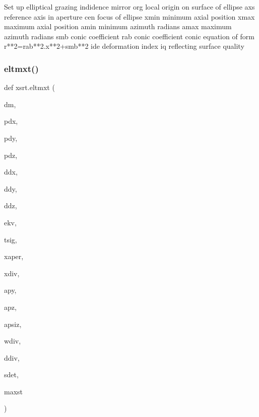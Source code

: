 \begin{DoxyVerb}Set up elliptical grazing indidence mirror
    org        local origin on surface of ellipse
    axs        reference axis in aperture
    cen        focus of ellipse
    xmin       minimum axial position
    xmax       maximum axial position
    amin       minimum azimuth radians
    amax       maximum azimuth radians
    smb        conic coefficient
    rab        conic coefficient
               conic equation of form r**2=rab**2.x**2+smb**2
    ide        deformation index
    iq         reflecting surface quality
\end{DoxyVerb}
 \mbox{\label{namespacexsrt_a55e0e47823b7992af486004eac82f724}} 
\subsubsection{\texorpdfstring{eltmxt()}{eltmxt()}}
{\footnotesize\ttfamily def xsrt.\+eltmxt (\begin{DoxyParamCaption}\item[{}]{dm,  }\item[{}]{pdx,  }\item[{}]{pdy,  }\item[{}]{pdz,  }\item[{}]{ddx,  }\item[{}]{ddy,  }\item[{}]{ddz,  }\item[{}]{ekv,  }\item[{}]{tsig,  }\item[{}]{xaper,  }\item[{}]{xdiv,  }\item[{}]{apy,  }\item[{}]{apz,  }\item[{}]{apsiz,  }\item[{}]{wdiv,  }\item[{}]{ddiv,  }\item[{}]{sdet,  }\item[{}]{maxst }\end{DoxyParamCaption})}

